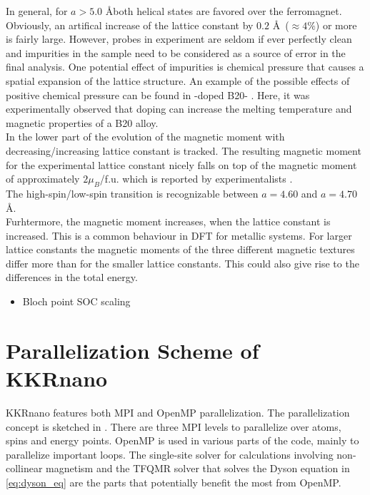 \documentclass [a4paper, 12pt]{article}
\begin{document}
In general, for $a>5.0$ \AA both helical states are favored over the ferromagnet.
\\
Obviously, an artifical increase of the lattice constant by
$0.2$ \AA \, ($\approx 4 \%$) or more is fairly large.
However, probes in experiment are seldom if ever perfectly clean and
impurities in the sample need to be considered as a source of error in the
final analysis. One potential
effect of impurities is chemical pressure that causes a spatial expansion of the
lattice structure.
An example of the possible effects of positive chemical pressure
can be found in -doped B20- \cite{stolt_chemical_2018}. 
Here, it was experimentally observed
that doping can increase the melting temperature and magnetic properties of a B20 alloy.
\\
In the lower part of  the evolution of the magnetic moment
with decreasing/increasing lattice constant is tracked.
The resulting magnetic moment for the experimental lattice constant nicely falls 
on top of the magnetic moment of approximately $2 \mu_{B}$/f.u. 
which is reported by experimentalists \cite{yaouanc_magnetic_2017}.
\\
The high-spin/low-spin transition is recognizable between $a=4.60$ and $a=4.70$ \AA.
\\
Furhtermore, the magnetic moment increases, when the lattice constant is increased.
This is a common behaviour in DFT for metallic systems.
For larger lattice constants the magnetic moments of the three different
magnetic textures differ more than for the smaller lattice constants.
This could also give rise to the differences in the total energy.

\begin{itemize}
	\item Bloch point SOC scaling
\end{itemize}

\section{Parallelization Scheme of KKRnano}
KKRnano features both MPI and OpenMP parallelization. The parallelization concept is sketched in
.
There are three MPI levels to parallelize over atoms,
spins and energy points. OpenMP is used in various parts of the code, mainly to parallelize important loops.
The single-site solver for calculations involving non-collinear magnetism
and the
TFQMR solver that solves the Dyson equation in \cref{eq:dyson_eq} 
are the parts that potentially benefit the most from OpenMP.
\end{document}
